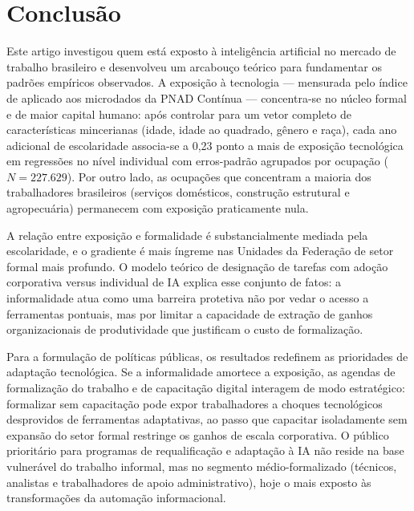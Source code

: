 \section{Conclusão}
\label{sec:conclusao}

Este artigo investigou quem está exposto à inteligência artificial no mercado de trabalho brasileiro e desenvolveu um arcabouço teórico para fundamentar os padrões empíricos observados. A exposição à tecnologia --- mensurada pelo índice de \citet{eloundou2024gpts} aplicado aos microdados da PNAD Contínua --- concentra-se no núcleo formal e de maior capital humano: após controlar para um vetor completo de características mincerianas (idade, idade ao quadrado, gênero e raça), cada ano adicional de escolaridade associa-se a 0{,}23 ponto a mais de exposição tecnológica em regressões no nível individual com erros-padrão agrupados por ocupação ($N = 227.629$). Por outro lado, as ocupações que concentram a maioria dos trabalhadores brasileiros (serviços domésticos, construção estrutural e agropecuária) permanecem com exposição praticamente nula.

A relação entre exposição e formalidade é substancialmente mediada pela escolaridade, e o gradiente é mais íngreme nas Unidades da Federação de setor formal mais profundo. O modelo teórico de designação de tarefas com adoção corporativa versus individual de IA explica esse conjunto de fatos: a informalidade atua como uma barreira protetiva não por vedar o acesso a ferramentas pontuais, mas por limitar a capacidade de extração de ganhos organizacionais de produtividade que justificam o custo de formalização.

Para a formulação de políticas públicas, os resultados redefinem as prioridades de adaptação tecnológica. Se a informalidade amortece a exposição, as agendas de formalização do trabalho e de capacitação digital interagem de modo estratégico: formalizar sem capacitação pode expor trabalhadores a choques tecnológicos desprovidos de ferramentas adaptativas, ao passo que capacitar isoladamente sem expansão do setor formal restringe os ganhos de escala corporativa. O público prioritário para programas de requalificação e adaptação à IA não reside na base vulnerável do trabalho informal, mas no segmento médio-formalizado (técnicos, analistas e trabalhadores de apoio administrativo), hoje o mais exposto às transformações da automação informacional.
